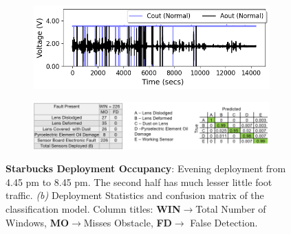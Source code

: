 \documentclass[manuscript,screen,review]{acmart} %
\newcommand{\cb}{{\it (b) }}
\providecommand{\DIFaddbeginFL}{} %
\providecommand{\DIFaddendFL}{} %
\providecommand{\DIFdelbeginFL}{} %
\providecommand{\DIFdelendFL}{} %
\newcommand{\DIFscaledelfig}{0.5}
\newlength{\DIFdelgraphicswidth} %
\newlength{\DIFdelgraphicsheight} %
\newcommand{\DIFaddincludegraphics}[2][]{{\color{blue}\fbox{\DIFOincludegraphics[#1]{#2}}}} %
\newcommand{\DIFdelincludegraphics}[2][]{%
\sbox{\DIFdelgraphicsbox}{\DIFOincludegraphics[#1]{#2}}%
\settoboxwidth{\DIFdelgraphicswidth}{\DIFdelgraphicsbox} %
\settoboxtotalheight{\DIFdelgraphicsheight}{\DIFdelgraphicsbox} %
\scalebox{\DIFscaledelfig}{%
\parbox[b]{\DIFdelgraphicswidth}{\usebox{\DIFdelgraphicsbox}\\[-\baselineskip] \rule{\DIFdelgraphicswidth}{0em}}\llap{\resizebox{\DIFdelgraphicswidth}{\DIFdelgraphicsheight}{%
\setlength{\unitlength}{\DIFdelgraphicswidth}%
\begin{picture}(1,1)%
\thicklines\linethickness{2pt} %
{\color[rgb]{1,0,0}\put(0,0){\framebox(1,1){}}}%
{\color[rgb]{1,0,0}\put(0,0){\line( 1,1){1}}}%
{\color[rgb]{1,0,0}\put(0,1){\line(1,-1){1}}}%
\end{picture}%
}\hspace*{3pt}}} %
} %
\DeclareRobustCommand{\DIFaddbeginFL}{\DIFOaddbeginFL \let\includegraphics\DIFaddincludegraphics} %
\DeclareRobustCommand{\DIFaddendFL}{\DIFOaddendFL \let\includegraphics\DIFOincludegraphics} %
\DeclareRobustCommand{\DIFdelbeginFL}{\DIFOdelbeginFL \let\includegraphics\DIFdelincludegraphics} %
\DeclareRobustCommand{\DIFdelendFL}{\DIFOaddendFL \let\includegraphics\DIFOincludegraphics} %
\begin{document}
\begin{figure}
	\DIFdelbeginFL %
\DIFdelendFL \DIFaddbeginFL \begin{subfigure}[t]{0.4\textwidth}
		\DIFaddendFL \centering
		\includegraphics[width=\textwidth]{figures/deployment/coffee_shop/starbucks_4hr_deployment.png}
\DIFdelbeginFL %
\DIFdelendFL \caption{}
		\label{fig:deployment_starbucks}
	\end{subfigure}\hfill \begin{subfigure}[b]{0.59\textwidth}
	    \centering
	    \includegraphics[width=\columnwidth]{figures/deployment/coffee_shop/confusion-matrix-coffeeshop-camera-ready.png}
	    \caption{}
	    \label{fig:coffeeshop_classification_results}
	\end{subfigure}
\DIFdelbeginFL %
\DIFdelendFL \caption{\footnotesize \textbf{Starbucks Deployment Occupancy}: Evening deployment from 4.45 pm to 8.45 pm. The second half has much lesser little foot traffic. \cb Deployment Statistics and confusion matrix of the classification model. Column titles: \textbf{WIN}$\rightarrow$Total Number of Windows, \textbf{MO}$\rightarrow$Misses Obstacle, \textbf{FD}$\rightarrow$ False Detection. }
\DIFdelbeginFL %
\DIFdelendFL \end{figure}
\end{document}
